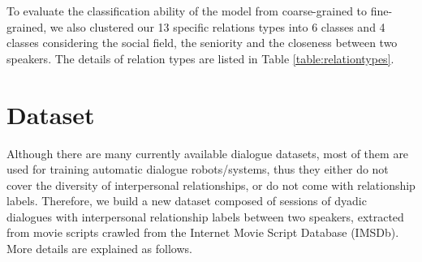 \documentclass[letterpaper]{article} \usepackage{aaai21}  \usepackage{times}  \usepackage{helvet} \usepackage{courier}  \usepackage[hyphens]{url}  \usepackage{graphicx} \usepackage{xcolor}
\begin{document}
To evaluate the classification ability of the model from coarse-grained to fine-grained, we also clustered our 13 specific 
relations types into 6 classes and 4 classes considering the social field, the seniority 
and the closeness between two speakers. The details of relation types are listed
in Table \ref{table:relationtypes}. 
\section{Dataset}
\label{sec:dataset}
Although there are many currently available dialogue datasets, 
most of them are used for training automatic dialogue robots/systems, 
thus they either do not cover the diversity of interpersonal relationships, 
or do not come with relationship labels.
Therefore, we build a new dataset 
composed of  sessions of dyadic dialogues with 
interpersonal relationship labels between two speakers, 
extracted from movie scripts crawled from 
the Internet Movie Script Database (IMSDb). More details are explained as follows. 
\end{document}
